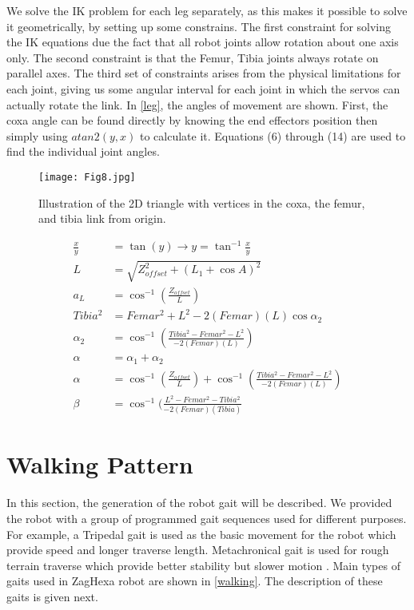 We solve the IK problem for each leg separately, as this makes it possible to solve it geometrically, by setting up some constrains. The first constraint for solving the IK equations due the fact that all robot joints allow rotation about one axis only. The second constraint is that the Femur, Tibia joints always rotate on parallel axes. The third set of constraints arises from the physical limitations for each joint, giving us some angular interval for each joint in which the servos can actually rotate the link. In \ref{leg}, the angles of movement are shown.
First, the coxa angle can be found directly by knowing the end effectors position then simply using $atan2(y,x)$ to calculate it. Equations (6) through (14) are used to find the individual joint angles.
\begin{figure}[h]
	\centering
	\texttt{[image: Fig8.jpg]}
	\caption{ Illustration of the 2D triangle with vertices in the coxa, the femur, and tibia link from origin.}
	\label{fig8}
\end{figure}

\begin{align}
    \frac{x}{y} & =\tan (y)\to y=\tan ^{-1}\frac{x}{y} \\
    L              & = \sqrt{Z_{offset}^{2}+(L_{1}+\cos A)^{2}}\\
    a_{L}        & = \cos ^{-1}(\frac{Z_{offset}}{L})\\
    Tibia^{2}  & =Femar^{2}+L^{2}-2(Femar)(L)\cos \alpha _{2} \\
    \alpha _{2} & =\cos^{-1}(\frac{Tibia^{2}-Femar^{2}-L^{2}}{-2(Femar)(L)}) \\
    \alpha      & =\alpha _{1}+\alpha _{2}\\
    \alpha      & = \cos ^{-1}(\frac{Z_{offset}}{L})+\cos ^{-1}(\frac{Tibia^{2}-Femar^{2}-L^{2}}{-2(Femar)(L)}) \\
    \beta        & = \cos^{-1}(\frac{L^{2}-Femar^{2}-Tibia^{2}}{-2(Femar)(Tibia)}
\end{align}


\section{Walking Pattern}
In this section, the generation of the robot gait will be described. We provided the robot with a group of programmed gait sequences used for different purposes. For example, a Tripedal gait is used as the basic movement for the robot which provide speed and longer traverse length. Metachronical gait is used for rough terrain traverse which provide better stability but slower motion \cite{29,31}. Main types of gaits used in ZagHexa robot are shown in \ref{walking}. The description of these gaits is given next.
